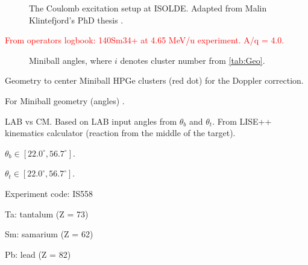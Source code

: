 \documentclass[twoside,english]{uiofysmaster/uiofysmaster}
\begin{document}
\begin{figure}[ht]
	\centering
	
	\caption{The Coulomb excitation setup at ISOLDE. Adapted from Malin Klintefjord's PhD thesis \cite{Klintefjord}.}
	\label{fig:Coulex}
\end{figure}

\textcolor{red}{From operators logbook: 140Sm34+ at 4.65 MeV/u experiment. A/q = 4.0.}


\begin{figure}[ht]
	\centering
	
	\caption{Miniball angles, where $i$ denotes cluster number from \autoref{tab:Geo}.}
	\label{fig:MB-angles}
\end{figure}


\begin{table}[ht] 
	\centering 
	\caption{Geometry to center Miniball HPGe clusters (red dot) for the Doppler correction.}
	
	\label{tab:Geo}
\end{table}
For Miniball geometry (angles) \cite{NWarr-Angles}. 







\begin{table}[ht] 
    \centering 
    \caption{LAB vs CM. Based on LAB input angles from $\theta_b$ and $\theta_t$. From LISE++ kinematics calculator (reaction from the middle of the target).}
	\label{tab:LABvsCM}
    \begin{subtable}{0.45\textwidth}
    		\centering
		\caption{$\theta_b \in [22.0^\circ, 56.7^\circ]$.}
	 	\label{tab:LABvsCM_b}
	 	
	\end{subtable}
	\begin{subtable}{0.45\textwidth}
		\centering
		\caption{$\theta_t \in [22.0^\circ, 56.7^\circ]$.}
		\label{tab:LABvsCM_t}
		
	\end{subtable}
\end{table}



\bigskip

Experiment code: IS558 

Ta: tantalum (Z = 73)

Sm: samarium (Z = 62)

Pb: lead (Z = 82) \newline
\end{document}
